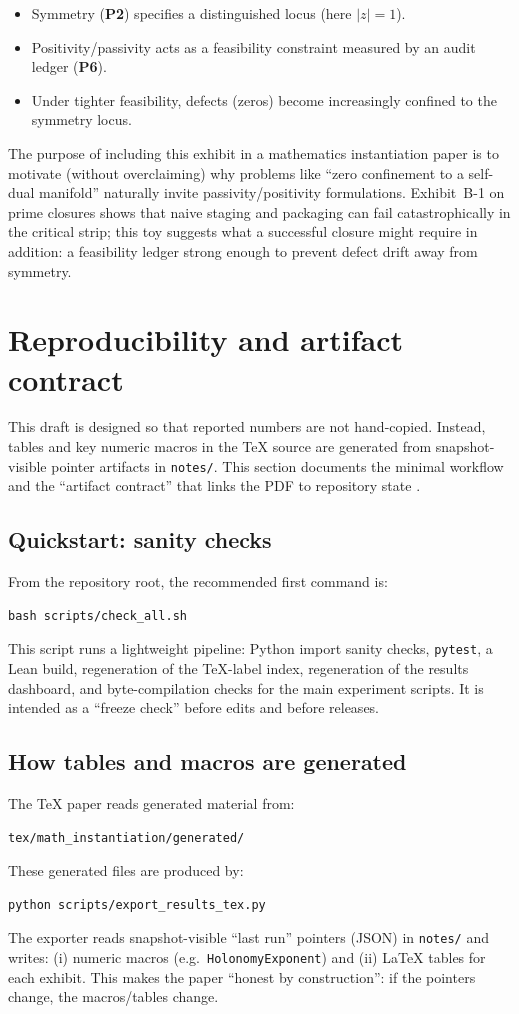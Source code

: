 \documentclass[apajournal,article,submit,moreauthors,pdftex]{Definitions/mdpi}
\newcommand{\Ptwo}{\textbf{P2}}
\newcommand{\Psix}{\textbf{P6}}
\begin{document}
\begin{itemize}
  \item Symmetry (\Ptwo) specifies a distinguished locus (here $|z|=1$).
  \item Positivity/passivity acts as a feasibility constraint measured by an audit ledger (\Psix).
  \item Under tighter feasibility, defects (zeros) become increasingly confined to the symmetry locus.
\end{itemize}

The purpose of including this exhibit in a mathematics instantiation paper is to motivate (without overclaiming) why problems like ``zero confinement to a self-dual manifold'' naturally invite passivity/positivity formulations.
Exhibit~B-1 on prime closures shows that naive staging and packaging can fail catastrophically in the critical strip; this toy suggests what a successful closure might require in addition: a feasibility ledger strong enough to prevent defect drift away from symmetry.
 \section{Reproducibility and artifact contract}
\label{sec:reproducibility}

This draft is designed so that reported numbers are not hand-copied.
Instead, tables and key numeric macros in the TeX source are generated from snapshot-visible pointer artifacts in \texttt{notes/}.
This section documents the minimal workflow and the ``artifact contract'' that links the PDF to repository state \cite{clt_repo}.

\subsection{Quickstart: sanity checks}
From the repository root, the recommended first command is:
\begin{verbatim}
bash scripts/check_all.sh
\end{verbatim}
This script runs a lightweight pipeline:
Python import sanity checks, \texttt{pytest}, a Lean build, regeneration of the TeX-label index, regeneration of the results dashboard, and byte-compilation checks for the main experiment scripts.
It is intended as a ``freeze check'' before edits and before releases.

\subsection{How tables and macros are generated}
The TeX paper reads generated material from:
\begin{verbatim}
tex/math_instantiation/generated/
\end{verbatim}
These generated files are produced by:
\begin{verbatim}
python scripts/export_results_tex.py
\end{verbatim}
The exporter reads snapshot-visible ``last run'' pointers (JSON) in \texttt{notes/} and writes:
(i) numeric macros (e.g.\ \texttt{HolonomyExponent}) and
(ii) LaTeX tables for each exhibit.
This makes the paper ``honest by construction'': if the pointers change, the macros/tables change.
\end{document}
